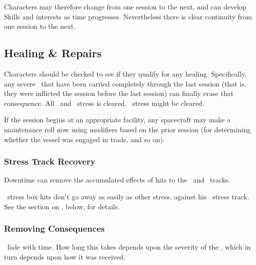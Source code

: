 Characters may therefore change from one session to the next, and can develop Skills and interests as time progresses. Nevertheless there is clear continuity from one session to the next.

\subsection{Healing \& Repairs}
\label{sec:healing-and-repairs}

Characters should be checked to see if they qualify for any healing. Specifically, any severe \Consequences\ that have been carried completely through the last session (that is, they were inflicted the session before the last session) can finally erase that consequence. All \Health\ and \Composure\ stress is cleared. \Wealth\ stress might be cleared.

If the session begins at an appropriate facility, any spacecraft may make a maintenance roll now using modifiers based on the prior session (for determining whether the vessel was engaged in trade, and so on).

\subsubsection{Stress Track Recovery}
\label{sec:Stress Track Recovery}

Downtime can remove the accumulated effects of hits to the \Health\ and \Composure\ tracks.


\Wealth\ stress box hits don't go away as easily as other stress.
 against his \Wealth\ stress track. See the section on , below, for details.

\subsubsection{Removing Consequences}
\label{sec:Removing Consequences}

\Consequences\ fade with time. How long this takes depends upon the severity of the \Consequence, which in turn depends upon how it was received.

